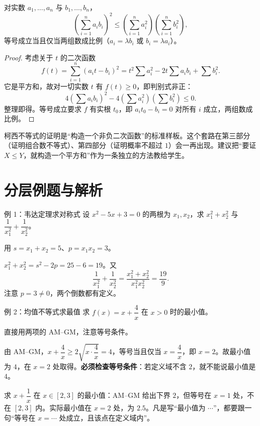 \begin{theorem}[柯西不等式]
对实数 $a_1,\ldots,a_n$ 与 $b_1,\ldots,b_n$，
\[
\left(\sum_{i=1}^n a_ib_i\right)^2\le\left(\sum_{i=1}^n a_i^2\right)\left(\sum_{i=1}^n b_i^2\right),
\]
等号成立当且仅当两组数成比例（$a_i=\lambda b_i$ 或 $b_i=\lambda a_i$）。
\end{theorem}
\begin{proof}
考虑关于 $t$ 的二次函数
\[
f(t)=\sum_{i=1}^n(a_it-b_i)^2
=t^2\sum a_i^2-2t\sum a_ib_i+\sum b_i^2.
\]
它是平方和，故对一切实数 $t$ 有 $f(t)\ge0$，即判别式非正：
\[
4\left(\sum a_ib_i\right)^2-4\left(\sum a_i^2\right)\left(\sum b_i^2\right)\le0.
\]
整理即得。等号成立要求 $f$ 有实根 $t_0$，即 $a_it_0-b_i=0$ 对所有 $i$ 成立，两组数成比例。
\end{proof}

\begin{teach}[配方法的示范价值]
柯西不等式的证明是“构造一个非负二次函数”的标准样板。这个套路在第三部分（证明组合数不等式）、第四部分（证明概率不超过 $1$）会一再出现。建议把“要证 $X\le Y$，就构造一个平方和”作为一条独立的方法教给学生。
\end{teach}

\section{分层例题与解析}
\begin{problem}{例 1：韦达定理求对称式}
设 $x^2-5x+3=0$ 的两根为 $x_1,x_2$，求 $x_1^2+x_2^2$ 与 $\dfrac1{x_1^2}+\dfrac1{x_2^2}$。
\end{problem}
\hint 用 $s=x_1+x_2=5$、$p=x_1x_2=3$。

\sol $x_1^2+x_2^2=s^2-2p=25-6=19$。又
\[
\frac1{x_1^2}+\frac1{x_2^2}=\frac{x_1^2+x_2^2}{x_1^2x_2^2}=\frac{19}{9}.
\]
注意 $p=3\ne0$，两个倒数都有定义。

\begin{problem}{例 2：均值不等式求最值}
求 $f(x)=x+\dfrac4x$ 在 $x>0$ 时的最小值。
\end{problem}
\hint 直接用两项的 AM--GM，注意等号条件。

\sol 由 AM--GM，$x+\dfrac4x\ge2\sqrt{x\cdot\dfrac4x}=4$，等号当且仅当 $x=\dfrac4x$，即 $x=2$。故最小值为 $4$，在 $x=2$ 处取得。\textbf{必须检查等号条件}：若定义域不含 $2$，就不能说最小值是 $4$。

\begin{pitfall}[忘了检查等号条件]
求 $x+\dfrac1x$ 在 $x\in[2,3]$ 的最小值：AM--GM 给出下界 $2$，但等号在 $x=1$ 处，不在 $[2,3]$ 内。实际最小值在 $x=2$ 处，为 $2.5$。凡是写“最小值为 $\cdots$”，都要跟一句“等号在 $x=\cdots$ 处成立，且该点在定义域内”。
\end{pitfall}

